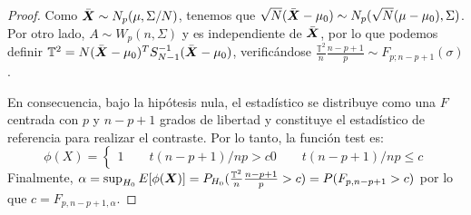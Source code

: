 \begin{proof}
  Como $\bar{\boldsymbol{X}} \sim N_p(\mu,\Sigma/N)$, tenemos que $\sqrt{N}(\bar{\boldsymbol{X}} - \mu_0) \sim N_p(\sqrt{N}(\mu-\mu_0),\Sigma)$. Por otro lado, $A\sim W_p(n,\Sigma)$ y es independiente de $\bar{\boldsymbol{X}}$, por lo que podemos definir $\mathbb T^2 = N(\bar{\boldsymbol{X}} - \mu_0)^T S_{N-1}^{-1} (\bar{\boldsymbol{X}} - \mu_0)$, verificándose $\frac{\mathbb T^2}{n}\frac{n-p+1}{p} \sim F_{p;n-p+1}(\sigma)$.

  En consecuencia, bajo la hipótesis nula, el estadístico se distribuye como una $F$ centrada con $p$ y $n-p+1$ grados de libertad y constituye el estadístico de referencia para realizar el contraste. Por lo tanto, la función test es:
  \[
  \phi(X) = \begin{cases}
    1 \qquad t(n-p+1)/np > c
    0 \qquad t(n-p+1)/np \leq c
  \end{cases}
  \]
  Finalmente, $\alpha = \sup_{H_0}E[\phi(\boldsymbol{X})] = P_{H_0}(\frac{\mathbb T^2}{n}\frac{n-p+1}{p} > c) = P(F_{p,n-p+1} > c)$ por lo que $c = F_{p,n-p+1,\alpha}$.
\end{proof}
